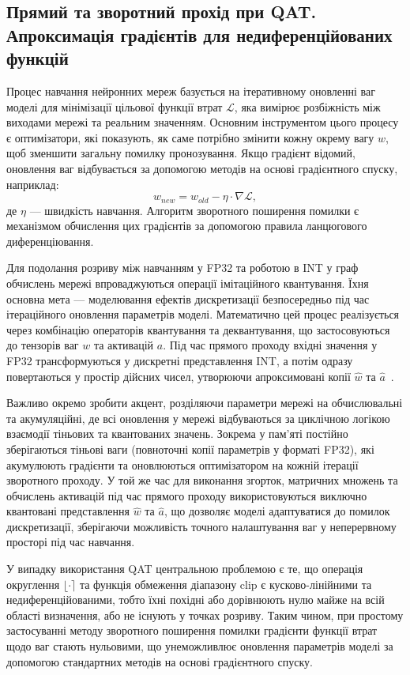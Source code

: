 \documentclass{pma-mthesis}
\begin{document}
\subsection{Прямий та зворотний прохід при QAT. Апроксимація градієнтів для недиференційованих функцій}

Процес навчання нейронних мереж базується на ітеративному оновленні ваг моделі для мінімізації цільової функції втрат $\mathcal{L}$, яка вимірює розбіжність між виходами мережі та реальним значенням. Основним інструментом цього процесу є оптимізатори, які показують, як саме потрібно змінити кожну окрему вагу $w$, щоб зменшити загальну помилку пронозування. Якщо градієнт відомий, оновлення ваг відбувається за допомогою методів на основі градієнтного спуску, наприклад: 
\begin{equation}
    w_{new} = w_{old} - \eta \cdot \nabla \mathcal{L},
\end{equation}
де $\eta$ --- швидкість навчання. Алгоритм зворотного поширення помилки є механізмом обчислення цих градієнтів за допомогою правила ланцюгового диференціювання.

Для подолання розриву між навчанням у FP32 та роботою в INT у граф обчислень мережі впроваджуються операції імітаційного квантування. Їхня основна мета --- моделювання ефектів дискретизації безпосередньо під час ітераційного оновлення параметрів моделі. Математично цей процес реалізується через комбінацію операторів квантування та деквантування, що застосовуються до тензорів ваг $w$ та активацій $a$. Під час прямого проходу вхідні значення у FP32 трансформуються у дискретні представлення INT, а потім одразу повертаються у простір дійсних чисел, утворюючи апроксимовані копії $\hat{w}$ та $\hat{a}$~\cite{jacob2018quantization}. 

Важливо окремо зробити акцент, розділяючи параметри мережі на обчислювальні та акумуляційні, де всі оновлення у мережі відбуваються за циклічною логікою взаємодії тіньових та квантованих значень. Зокрема у пам'яті постійно зберігаються тіньові ваги (повноточні копії параметрів у форматі FP32), які акумулюють градієнти та оновлюються оптимізатором на кожній ітерації зворотного проходу. У той же час для виконання згорток, матричних множень та обчислень активацій під час прямого проходу використовуються виключно квантовані представлення $\hat{w}$ та $\hat{a}$, що дозволяє моделі адаптуватися до помилок дискретизації, зберігаючи можливість точного налаштування ваг у неперервному просторі під час навчання.

У випадку використання QAT центральною проблемою є те, що операція округлення $\lfloor \cdot \rceil$ та функція обмеження діапазону $\text{clip}$ є кусково-лінійними та недиференційованими, тобто їхні похідні або дорівнюють нулю майже на всій області визначення, або не існують у точках розриву. Таким чином, при простому застосуванні методу зворотного поширення помилки градієнти функції втрат щодо ваг стають нульовими, що унеможливлює оновлення параметрів моделі за допомогою стандартних методів на основі градієнтного спуску.
\end{document}
